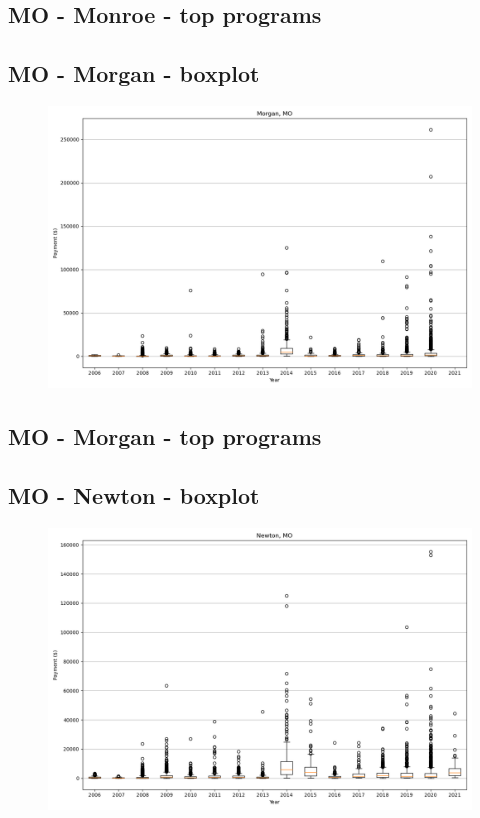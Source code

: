 \subsection*{MO - Monroe - top programs}

\newpage
\subsection*{MO - Morgan - boxplot}
\begin{figure}[h]
\centering
\includegraphics[width=7in]{../output/boxplots/counties/Morgan-MO_boxplot.png}
\end{figure}


\subsection*{MO - Morgan - top programs}

\newpage
\subsection*{MO - Newton - boxplot}
\begin{figure}[h]
\centering
\includegraphics[width=7in]{../output/boxplots/counties/Newton-MO_boxplot.png}
\end{figure}


